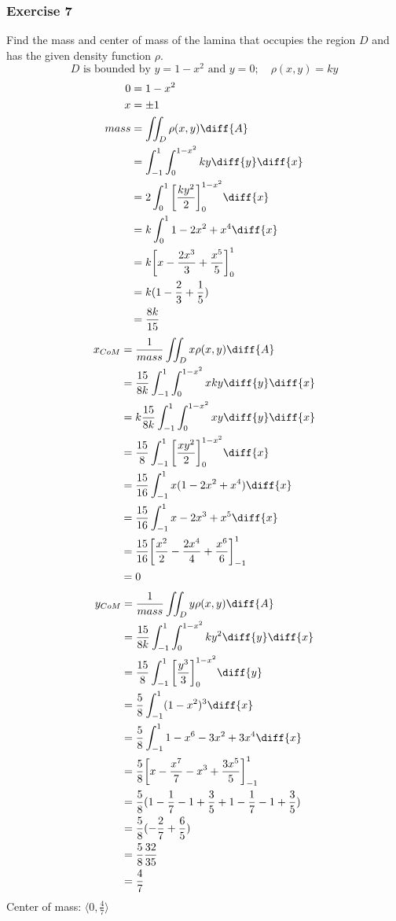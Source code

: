 \documentclass{math}
\begin{document}
\subsubsection*{Exercise 7}
Find the mass and center of mass of the lamina that occupies the region \( D \)
and has the given density function \( \rho \).
\[ D \text{ is bounded by } y = 1-x^2 \text{ and } y = 0;\quad\rho(x,y) = ky \]
\begin{align*}
  0 &= 1-x^2 \\
  x &= \pm1 \\
  mass &= \iint_{D}\rho(x,y)\diff{A} \\
  &= \int_{-1}^{1}\int_{0}^{1-x^2}ky\diff{y}\diff{x} \\
  &= 2\int_{0}^{1}\bigg[\frac{ky^2}{2}\bigg]_{0}^{1-x^2}\diff{x} \\
  &= k\int_{0}^{1}1-2x^2+x^4\diff{x} \\
  &= k\bigg[x-\frac{2x^3}{3}+\frac{x^5}{5}\bigg]_{0}^{1} \\
  &= k(1-\frac{2}{3}+\frac{1}{5}) \\
  &= \frac{8k}{15}
\end{align*}
\begin{align*}
  x_{CoM} &= \frac{1}{mass}\iint_{D}x\rho(x,y)\diff{A} \\
  &= \frac{15}{8k}\int_{-1}^{1}\int_{0}^{1-x^2}xky\diff{y}\diff{x} \\
  &= k\frac{15}{8k}\int_{-1}^{1}\int_{0}^{1-x^2}xy\diff{y}\diff{x} \\
  &= \frac{15}{8}\int_{-1}^{1}\bigg[\frac{xy^2}{2}\bigg]_{0}^{1-x^2}\diff{x} \\
  &= \frac{15}{16}\int_{-1}^{1}x(1-2x^2+x^4)\diff{x} \\
  &= \frac{15}{16}\int_{-1}^{1}x-2x^3+x^5\diff{x} \\
  &= \frac{15}{16}
    \bigg[\frac{x^2}{2}-\frac{2x^4}{4}+\frac{x^6}{6}\bigg]_{-1}^{1} \\
  &= 0
\end{align*}
\begin{align*}
  y_{CoM} &= \frac{1}{mass}\iint_{D}y\rho(x,y)\diff{A} \\
  &= \frac{15}{8k}\int_{-1}^{1}\int_{0}^{1-x^2}ky^2\diff{y}\diff{x} \\
  &= \frac{15}{8}\int_{-1}^{1}\bigg[\frac{y^3}{3}\bigg]_{0}^{1-x^2}\diff{y} \\
  &= \frac{5}{8}\int_{-1}^{1}(1-x^2)^3\diff{x} \\
  &= \frac{5}{8}\int_{-1}^{1}1-x^6-3x^2+3x^4\diff{x} \\
  &= \frac{5}{8}\bigg[x-\frac{x^7}{7}-x^3+\frac{3x^5}{5}\bigg]_{-1}^{1} \\
  &= \frac{5}{8}(1-\frac{1}{7}-1+\frac{3}{5}+1-\frac{1}{7}-1+\frac{3}{5}) \\
  &= \frac{5}{8}(-\frac{2}{7}+\frac{6}{5}) \\
  &= \frac{5}{8}\frac{32}{35} \\
  &= \frac{4}{7}
\end{align*}
Center of mass: \( \langle0,\frac{4}{7}\rangle \)
\end{document}
